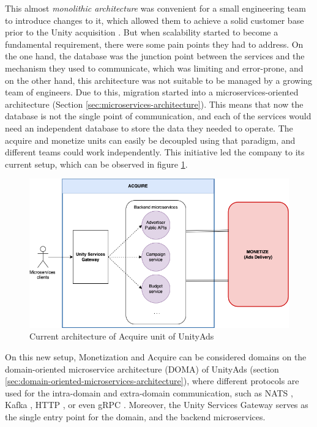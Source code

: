 \documentclass[english, 12pt, a4paper, sci, utf8, a-1b, online]{aaltothesis}
\begin{document}
This almost \textit{monolithic architecture} \cite{de2019monolithic} was convenient for a small engineering team to introduce changes to it, which allowed them to achieve a solid customer base prior to the Unity acquisition \cite{ApplifierCustomers}. But when scalability started to become a fundamental requirement, there were some pain points they had to address. On the one hand, the database was the junction point between the services and the mechanism they used to communicate, which was limiting and error-prone, and on the other hand, this architecture was not suitable to be managed by a growing team of engineers. Due to this, migration started into a microservices-oriented architecture (Section \ref{sec:microservices-architecture}). This means that now the database is not the single point of communication, and each of the services would need an independent database to store the data they needed to operate. The acquire and monetize units can easily be decoupled using that paradigm, and different teams could work independently. This initiative led the company to its current setup, which can be observed in figure \ref{fig:background:acquire-architecture}.\\

\begin{figure}[h!]
    \centering
    \includegraphics[scale=0.3]{src/thesis/img/background/acquire-division.png}
    \caption{Current architecture of Acquire unit of UnityAds}
    \label{fig:background:acquire-architecture}
\end{figure}

On this new setup, Monetization and Acquire can be considered domains on the domain-oriented microservice architecture (DOMA) of UnityAds (section \ref{sec:domain-oriented-microservices-architecture}), where different protocols are used for the intra-domain and extra-domain communication, such as NATS \cite{srisuresh2008state}, Kafka \cite{kreps2011kafka}, HTTP \cite{durumeric2013analysis}, or even gRPC \cite{wang1993grpc}. Moreover, the Unity Services Gateway serves as the single entry point for the domain, and the backend microservices.
\end{document}
